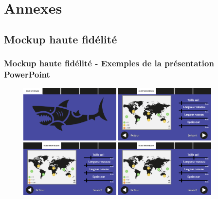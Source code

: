 \documentclass{article}
\begin{document}
\newpage
\section{Annexes}

\subsection{Mockup haute fidélité}
\subsubsection{Mockup haute fidélité - Exemples de la présentation PowerPoint}

\begin{figure}[!h]

	\centering
	\includegraphics[width=0.45\textwidth]{assets/prototype/haute/Diapositive1}
	\hfill
	\includegraphics[width=0.45\textwidth]{assets/prototype/haute/Diapositive2}
	\includegraphics[width=0.45\textwidth]{assets/prototype/haute/Diapositive3}
	\hfill
	\includegraphics[width=0.45\textwidth]{assets/prototype/haute/Diapositive4}

\end{figure}
\end{document}
